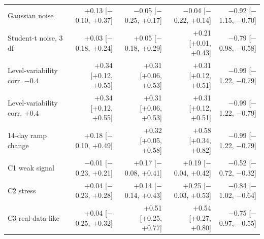 \begin{table}[!htbp]
\begin{tabular}{@{}p{4.6cm}rrrr@{}}
Gaussian noise & +0.13 [$-$0.10, +0.37] & $-$0.05 [$-$0.25, +0.17] & $-$0.04 [$-$0.22, +0.14] & $-$0.92 [$-$1.15, $-$0.70] \\
Student-t noise, 3 df & +0.03 [$-$0.18, +0.24] & +0.05 [$-$0.18, +0.29] & +0.21 [+0.01, +0.43] & $-$0.79 [$-$0.98, $-$0.58] \\
Level-variability corr. $-0.4$ & +0.34 [+0.12, +0.55] & +0.31 [+0.06, +0.53] & +0.31 [+0.12, +0.51] & $-$0.99 [$-$1.22, $-$0.79] \\
Level-variability corr. $+0.4$ & +0.34 [+0.12, +0.55] & +0.31 [+0.06, +0.53] & +0.31 [+0.12, +0.51] & $-$0.99 [$-$1.22, $-$0.79] \\
14-day ramp change & +0.18 [$-$0.10, +0.49] & +0.32 [+0.05, +0.58] & +0.58 [+0.34, +0.82] & $-$0.99 [$-$1.22, $-$0.79] \\
\midrule
C1 weak signal & $-$0.01 [$-$0.23, +0.21] & +0.17 [$-$0.08, +0.41] & +0.19 [$-$0.04, +0.42] & $-$0.52 [$-$0.72, $-$0.32] \\
C2 stress & +0.04 [$-$0.23, +0.28] & +0.14 [$-$0.14, +0.43] & +0.25 [$-$0.03, +0.53] & $-$0.84 [$-$1.02, $-$0.64] \\
C3 real-data-like & +0.04 [$-$0.25, +0.32] & +0.51 [+0.25, +0.77] & +0.54 [+0.27, +0.80] & $-$0.75 [$-$0.97, $-$0.55] \\
\bottomrule
\end{tabular}
\end{table}
